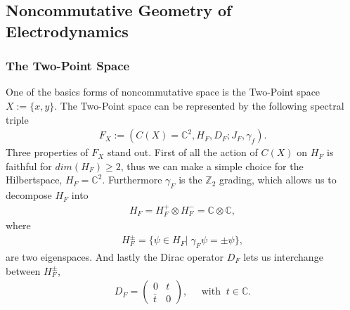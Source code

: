 \subsection{Noncommutative Geometry of Electrodynamics}
\subsubsection{The Two-Point Space}
One of the basics forms of noncommutative space is the Two-Point space $X
:= \{x, y\}$. The Two-Point space can be represented by the following spectral triple
\begin{align}
    F_X := (C(X) = \mathbb{C}^2, H_F, D_F; J_F, \gamma _f).
\end{align}
Three properties of $F_X$ stand out. First of all the action of
$C(X)$ on $H_F$ is faithful for $dim(H_F) \geq 2$, thus we can make a simple
choice for the Hilbertspace, $H_F = \mathbb{C}^2$. Furthermore $\gamma_F$ is
the $\mathbb{Z}_2$ grading, which allows us to decompose $H_F$ into
\begin{align}
   H_F = H_F^+ \otimes H_F^- = \mathbb{C} \otimes \mathbb{C},
\end{align}
where
\begin{align}
    H_F^\pm = \{\psi \in H_F |\; \gamma_F\psi = \pm \psi\},
\end{align}
are two eigenspaces. And lastly the Dirac operator $D_F$ lets us
interchange between $H_F^\pm$,
\begin{align}
    D_F =
        \begin{pmatrix}0 & t \\ \bar{t} & 0\end{pmatrix},  \;\;\;\;\;
            \text{with} \;\; t\in\mathbb{C}.
\end{align}

